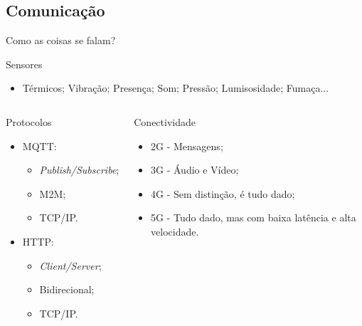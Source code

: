 \subsection*{Comunicação}
\begin{frame}{Como as coisas se falam?}
	\begin{block}{Sensores}
		\begin{itemize}
			\item Térmicos; Vibração; Presença; Som; Pressão; Lumisosidade; Fumaça...
		\end{itemize}
	\end{block}
	
	\begin{columns}
		\begin{block}{Protocolos}
			\begin{itemize}
				\item MQTT:
					\begin{itemize}
						\item \textit{Publish/Subscribe};
						\item M2M;
						\item TCP/IP.
					\end{itemize} 
				\item HTTP: 
					\begin{itemize}
						\item \textit{Client/Server};
						\item Bidirecional;
						\item TCP/IP.
					\end{itemize}
			\end{itemize}
		\end{block}
		
		\begin{block}{Conectividade}
			\begin{itemize}
				\item 2G - Mensagens;
				\item 3G - Áudio e Vídeo;
				\item 4G - Sem distinção, é tudo dado;
				\item 5G - Tudo dado, mas com baixa latência e alta velocidade.
			\end{itemize}
		\end{block}
	\end{columns}
\end{frame}

